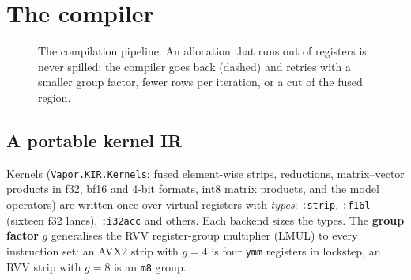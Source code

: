 \chapter{The compiler}\label{ch:compiler}

\begin{figure}[h]
\centering
{}
\caption{The compilation pipeline. An allocation that runs out of registers is never spilled: the
compiler goes back (dashed) and retries with a smaller group factor, fewer rows per iteration, or a cut of the fused region.}
\end{figure}

\section{A portable kernel IR}

Kernels (\texttt{Vapor.KIR.Kernels}: fused element-wise strips, reductions, matrix--vector products in
f32, bf16 and 4-bit formats, int8 matrix products, and the model operators) are written once over
virtual registers with \emph{types}: \texttt{:strip}, \texttt{:f16l} (sixteen f32 lanes),
\texttt{:i32acc} and others. Each backend sizes the types. The \textbf{group factor} $g$ generalises
the RVV register-group multiplier (LMUL) to every instruction set: an AVX2 strip with $g=4$ is four
\texttt{ymm} registers in lockstep, an RVV strip with $g=8$ is an \texttt{m8} group.

